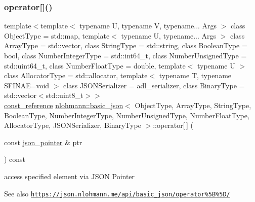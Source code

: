 \subsubsection{\texorpdfstring{operator[]()}{operator[]()}\hspace{0.1cm}{\footnotesize\ttfamily [8/8]}}
{\footnotesize\ttfamily template$<$template$<$ typename U, typename V, typename... Args $>$ class Object\+Type = std\+::map, template$<$ typename U, typename... Args $>$ class Array\+Type = std\+::vector, class String\+Type  = std\+::string, class Boolean\+Type  = bool, class Number\+Integer\+Type  = std\+::int64\+\_\+t, class Number\+Unsigned\+Type  = std\+::uint64\+\_\+t, class Number\+Float\+Type  = double, template$<$ typename U $>$ class Allocator\+Type = std\+::allocator, template$<$ typename T, typename S\+F\+I\+N\+A\+E=void $>$ class J\+S\+O\+N\+Serializer = adl\+\_\+serializer, class Binary\+Type  = std\+::vector$<$std\+::uint8\+\_\+t$>$$>$ \\
\hyperlink{classnlohmann_1_1basic__json_ab8a1c33ee7b154fc41ca2545aa9724e6}{const\+\_\+reference} \hyperlink{classnlohmann_1_1basic__json}{nlohmann\+::basic\+\_\+json}$<$ Object\+Type, Array\+Type, String\+Type, Boolean\+Type, Number\+Integer\+Type, Number\+Unsigned\+Type, Number\+Float\+Type, Allocator\+Type, J\+S\+O\+N\+Serializer, Binary\+Type $>$\+::operator\mbox{[}$\,$\mbox{]} (\begin{DoxyParamCaption}\item[{const \hyperlink{classnlohmann_1_1basic__json_aa8f1f93b32da01b42413643be32b2c27}{json\+\_\+pointer} \&}]{ptr }\end{DoxyParamCaption}) const\hspace{0.3cm}{\ttfamily [inline]}}



access specified element via J\+S\+ON Pointer 

\begin{DoxySeeAlso}{See also}
\href{https://json.nlohmann.me/api/basic_json/operator%5B%5D/}{\tt https\+://json.\+nlohmann.\+me/api/basic\+\_\+json/operator\%5\+B\%5\+D/} 
\end{DoxySeeAlso}
\mbox{\label{classnlohmann_1_1basic__json_a15018ade392a844ea32d5188d1a0b9c6}} 
